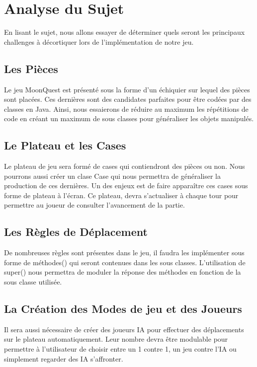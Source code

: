 \documentclass[titlepage]{report}
\begin{document}
\chapter{Analyse du Sujet}

En lisant le sujet, nous allons essayer de déterminer quels seront les principaux challenges à décortiquer lors de l’implémentation de notre jeu.

\section{Les Pièces}
Le jeu MoonQuest est présenté sous la forme d'un échiquier sur lequel des pièces sont placées. Ces dernières sont des candidates parfaites pour être codées par des classes en Java. Ainsi, nous essaierons de réduire au maximum les répétitions de code en créant un maximum de sous classes pour généraliser les objets manipulés.

\section{Le Plateau et les Cases}
Le plateau de jeu sera formé de cases qui contiendront des pièces ou non. Nous pourrons aussi créer un clase Case qui nous permettra de généraliser la production de ces dernières. Un des enjeux est de faire apparaître ces cases sous forme de plateau à l'écran. Ce plateau, devra s’actualiser à chaque tour pour permettre au joueur de consulter l’avancement de la partie. 

\section{Les Règles de Déplacement}
De nombreuses règles sont présentes dans le jeu, il faudra les implémenter sous forme de méthodes() qui seront contenues dans les sous classes. L’utilisation de super() nous permettra de moduler la réponse des méthodes en fonction de la sous classe utilisée.

\section{La Création des Modes de jeu et des Joueurs}
Il sera aussi nécessaire de créer des joueurs IA pour effectuer des déplacements sur le plateau automatiquement. Leur nombre devra être modulable pour permettre à l’utilisateur de choisir entre un 1 contre 1, un jeu contre l’IA ou simplement regarder des IA s’affronter.\\
\end{document}
